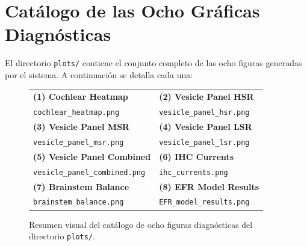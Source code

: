 \documentclass[12pt,a4paper]{article}
\begin{document}
\section{Catálogo de las Ocho Gráficas Diagnósticas}

El directorio {\texttt{plots/}} contiene el conjunto completo de las ocho figuras generadas por el sistema. A continuación se detalla cada una:

\begin{figure}[H]
    \centering
    \caption{Resumen visual del catálogo de ocho figuras diagnósticas del directorio \texttt{plots/}.}
    \label{fig:catalogo_plots}
    \begin{tabularx}{\textwidth}{>{\centering\arraybackslash}X >{\centering\arraybackslash}X}
        \textbf{(1) Cochlear Heatmap} & \textbf{(2) Vesicle Panel HSR} \\
        \texttt{cochlear\_heatmap.png} & \texttt{vesicle\_panel\_hsr.png} \\[0.5em]
        \textbf{(3) Vesicle Panel MSR} & \textbf{(4) Vesicle Panel LSR} \\
        \texttt{vesicle\_panel\_msr.png} & \texttt{vesicle\_panel\_lsr.png} \\[0.5em]
        \textbf{(5) Vesicle Panel Combined} & \textbf{(6) IHC Currents} \\
        \texttt{vesicle\_panel\_combined.png} & \texttt{ihc\_currents.png} \\[0.5em]
        \textbf{(7) Brainstem Balance} & \textbf{(8) EFR Model Results} \\
        \texttt{brainstem\_balance.png} & \texttt{EFR\_model\_results.png} \\
    \end{tabularx}
\end{figure}
\end{document}
